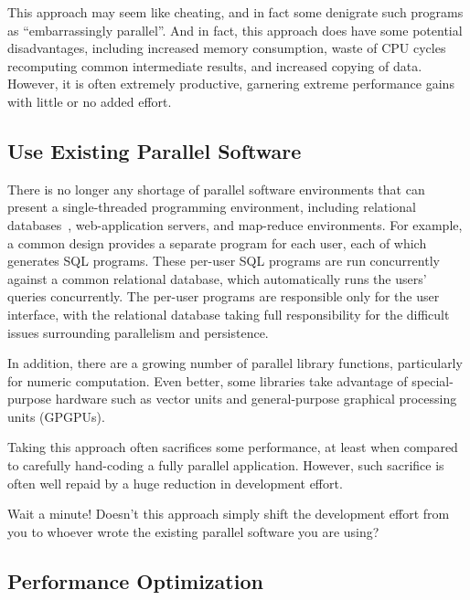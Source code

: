 This approach may seem like cheating, and in fact some denigrate such
programs as ``embarrassingly parallel''.
And in fact, this approach does have some potential disadvantages,
including increased memory consumption, waste of CPU cycles recomputing
common intermediate results, and increased copying of data.
However, it is often  extremely productive, garnering extreme performance
gains with little or no added effort.

\subsection{Use Existing Parallel Software}
\label{sec:intro:Use Existing Parallel Software}

There is no longer any shortage of parallel software environments that
can present a single-threaded programming environment,
including relational
databases~\cite{Date82},
web-application servers, and map-reduce environments.
For example, a common design provides a separate program for each
user, each of which generates SQL programs.
These per-user SQL programs are run concurrently against a common
relational database, which automatically runs the users' queries concurrently.
The per-user programs are responsible only for the user interface,
with the relational database taking full responsibility for the
difficult issues surrounding parallelism and persistence.

In addition, there are a growing number of parallel library functions,
particularly for numeric computation.
Even better, some libraries take advantage of special-purpose
hardware such as vector units and general-purpose graphical processing
units (GPGPUs).

Taking this approach often sacrifices some performance, at least when
compared to carefully hand-coding a fully parallel application.
However, such sacrifice is often well repaid by a huge reduction in
development effort.

\QuickQuiz{}
	Wait a minute!
	Doesn't this approach simply shift the development effort from
	you to whoever wrote the existing parallel software you are using?
 \QuickQuizEnd

\subsection{Performance Optimization}
\label{sec:intro:Performance Optimization}

